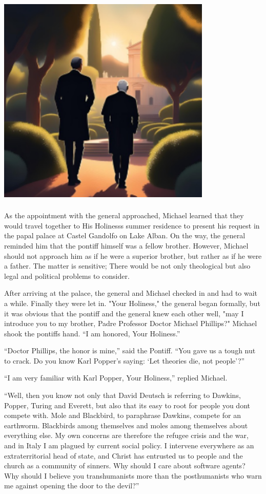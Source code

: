 \documentclass[
]{article}
\begin{document}
\includegraphics[width=4.02239in,height=4.06863in]{media/image1.png}

As the appointment with the general approached, Michael learned that
they would travel together to His Holiness\textquotesingle s summer
residence to present his request in the papal palace at Castel Gandolfo
on Lake Alban. On the way, the general reminded him that the pontiff
himself was a fellow brother. However, Michael should not approach him
as if he were a superior brother, but rather as if he were a father. The
matter is sensitive; There would be not only theological but also legal
and political problems to consider.

After arriving at the palace, the general and Michael checked in and had
to wait a while. Finally they were let in. "Your Holiness," the general
began formally, but it was obvious that the pontiff and the general knew
each other well, "may I introduce you to my brother, Padre Professor
Doctor Michael Phillips?" Michael shook the pontiff\textquotesingle s
hand. ``I am honored, Your Holiness.''

``Doctor Phillips, the honor is mine,'' said the Pontiff. ``You gave us
a tough nut to crack. Do you know Karl Popper's saying: `Let theories
die, not people'?''

``I am very familiar with Karl Popper, Your Holiness,'' replied Michael.

``Well, then you know not only that David Deutsch is referring to
Dawkins, Popper, Turing and Everett, but also that it\textquotesingle s
easy to root for people you don\textquotesingle t compete with. Mole and
Blackbird, to paraphrase Dawkins, compete for an earthworm. Blackbirds
among themselves and moles among themselves about everything else. My
own concerns are therefore the refugee crisis and the war, and in Italy
I am plagued by current social policy. I intervene everywhere as an
extraterritorial head of state, and Christ has entrusted us to people
and the church as a community of sinners. Why should I care about
software agents? Why should I believe you transhumanists more than the
posthumanists who warn me against opening the door to the devil?''
\end{document}
